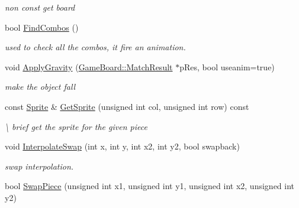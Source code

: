 \begin{DoxyCompactItemize}
\begin{DoxyCompactList}\small\item\em non const get board \end{DoxyCompactList}\item 
\hypertarget{class_game_logic_aab1d9bd357ee71541d4faf9dea5a4b40}{bool \hyperlink{class_game_logic_aab1d9bd357ee71541d4faf9dea5a4b40}{Find\-Combos} ()}\label{class_game_logic_aab1d9bd357ee71541d4faf9dea5a4b40}

\begin{DoxyCompactList}\small\item\em used to check all the combos, it fire an animation. \end{DoxyCompactList}\item 
void \hyperlink{class_game_logic_a6519d0f7ccd9424c3595cfc3a63b5e8e}{Apply\-Gravity} (\hyperlink{struct_game_board_1_1_match_result}{Game\-Board\-::\-Match\-Result} $\ast$p\-Res, bool useanim=true)
\begin{DoxyCompactList}\small\item\em make the object fall \end{DoxyCompactList}\item 
\hypertarget{class_game_logic_ad0dcf5b5afb73b8ca5eecd04a0f8fa29}{const \hyperlink{struct_sprite}{Sprite} \& \hyperlink{class_game_logic_ad0dcf5b5afb73b8ca5eecd04a0f8fa29}{Get\-Sprite} (unsigned int col, unsigned int row) const }\label{class_game_logic_ad0dcf5b5afb73b8ca5eecd04a0f8fa29}

\begin{DoxyCompactList}\small\item\em \textbackslash{} brief get the sprite for the given piece \end{DoxyCompactList}\item 
\hypertarget{class_game_logic_af2ad4d5ba418e5b07a72a30b9124921e}{void \hyperlink{class_game_logic_af2ad4d5ba418e5b07a72a30b9124921e}{Interpolate\-Swap} (int x, int y, int x2, int y2, bool swapback)}\label{class_game_logic_af2ad4d5ba418e5b07a72a30b9124921e}

\begin{DoxyCompactList}\small\item\em swap interpolation. \end{DoxyCompactList}\item 
\hypertarget{class_game_logic_a5f2ea322ec3419c6c620a650589210d9}{bool \hyperlink{class_game_logic_a5f2ea322ec3419c6c620a650589210d9}{Swap\-Piece} (unsigned int x1, unsigned int y1, unsigned int x2, unsigned int y2)}\label{class_game_logic_a5f2ea322ec3419c6c620a650589210d9}


\end{DoxyCompactItemize}
